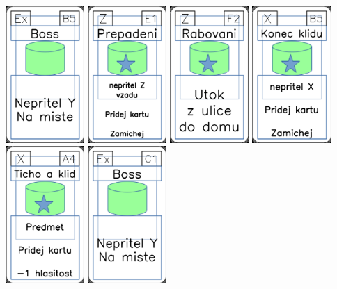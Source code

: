 \documentclass[a4paper]{article}
\begin{document}
	\includegraphics[width=3.0cm]{img-4_9}
	\includegraphics[width=3.0cm]{img-5_50}
	\includegraphics[width=3.0cm]{img-5_56}
	\includegraphics[width=3.0cm]{img-5_9}
	\includegraphics[width=3.0cm]{img-5_3}
	\includegraphics[width=3.0cm]{img-4_10}
\end{document}
